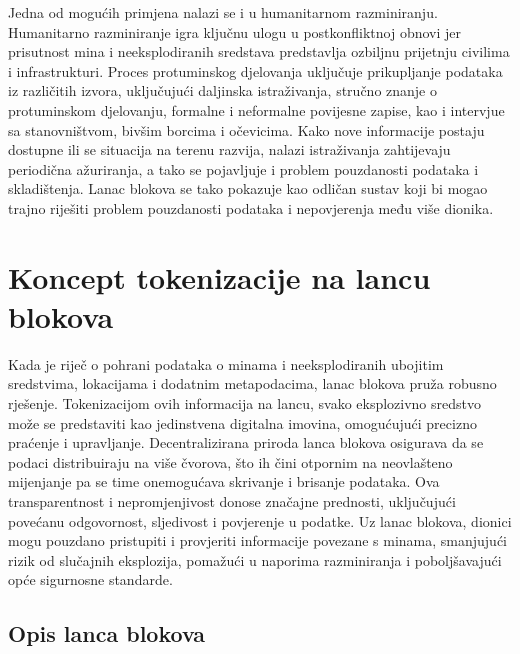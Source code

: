 \documentclass[times, utf8, diplomski]{fer}
\begin{document}
Jedna od mogućih primjena nalazi se i u humanitarnom razminiranju. Humanitarno razminiranje igra ključnu ulogu u postkonfliktnoj obnovi jer prisutnost mina i neeksplodiranih  sredstava predstavlja ozbiljnu prijetnju civilima i infrastrukturi. Proces protuminskog djelovanja uključuje prikupljanje podataka iz različitih izvora, uključujući daljinska istraživanja, stručno znanje o protuminskom djelovanju, formalne i neformalne povijesne zapise, kao i intervjue sa stanovništvom, bivšim borcima i očevicima. Kako nove informacije postaju dostupne ili se situacija na terenu razvija, nalazi istraživanja zahtijevaju periodična ažuriranja, a tako se pojavljuje i problem pouzdanosti podataka i skladištenja. Lanac blokova se tako pokazuje kao odličan sustav koji bi mogao trajno riješiti problem pouzdanosti podataka i nepovjerenja među više dionika. 

\chapter{Koncept tokenizacije na lancu blokova}

Kada je riječ o pohrani podataka o minama i neeksplodiranih ubojitim sredstvima, lokacijama i dodatnim metapodacima, lanac blokova pruža robusno rješenje. Tokenizacijom ovih informacija na lancu, svako eksplozivno sredstvo može se predstaviti kao jedinstvena digitalna imovina, omogućujući precizno praćenje i upravljanje. Decentralizirana priroda lanca blokova osigurava da se podaci distribuiraju na više čvorova, što ih čini otpornim na neovlašteno mijenjanje pa se time onemogućava skrivanje i brisanje podataka. Ova transparentnost i nepromjenjivost donose značajne prednosti, uključujući povećanu odgovornost, sljedivost i povjerenje u podatke. Uz lanac blokova, dionici mogu pouzdano pristupiti i provjeriti informacije povezane s minama, smanjujući rizik od slučajnih eksplozija, pomažući u naporima razminiranja i poboljšavajući opće sigurnosne standarde.

\section{Opis lanca blokova}
\end{document}
